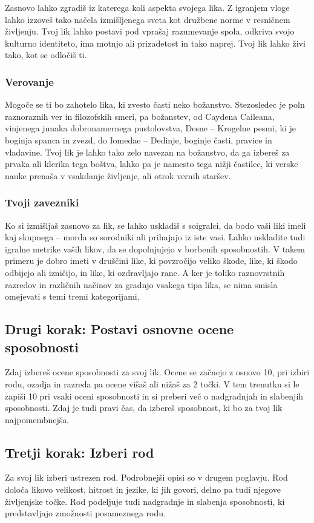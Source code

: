 Zasnovo lahko zgradiš iz katerega koli aspekta svojega lika. Z igranjem vloge lahko izzoveš tako načela izmišljenega sveta kot družbene norme v resničnem življenju. Tvoj lik lahko postavi pod vprašaj razumevanje spola, odkriva svojo kulturno identiteto, ima motnjo ali prizadetost in tako naprej. Tvoj lik lahko živi tako, kot se odločiš ti.

\subsubsection{Verovanje}
Mogoče se ti bo zahotelo lika, ki zvesto časti neko božanstvo. Stezosledec je poln raznoraznih ver in filozofskih smeri, pa božanstev, od Caydena Caileana, vinjenega junaka dobronamernega pustolovstva, Desne -- Krogelne pesmi, ki je boginja spanca in zvezd, do Iomedae -- Dedinje, boginje časti, pravice in vladavine. Tvoj lik je lahko tako zelo navezan na božanstvo, da ga izbereš za prvaka ali klerika tega boštva, lahko pa je namesto tega nižji častilec, ki verske nauke prenaša v vsakdanje življenje, ali otrok vernih staršev.

\subsubsection{Tvoji zavezniki}
Ko si izmišljaš zasnovo za lik, se lahko uskladiš s soigralci, da bodo vaši liki imeli kaj skupnega -- morda so sorodniki ali prihajajo iz iste vasi. Lahko uskladite tudi igralne metrike vaših likov, da se dopolnjujejo v borbenih sposobnostih. V takem primeru je dobro imeti v druščini like, ki povzročijo veliko škode, like, ki škodo odbijejo ali izničijo, in like, ki ozdravljajo rane. A ker je toliko raznovrstnih razredov in različnih načinov za gradnjo vsakega tipa lika, se nima smisla omejevati s temi tremi kategorijami.

\subsection{Drugi korak: Postavi osnovne ocene sposobnosti}
Zdaj izbereš ocene sposobnosti za svoj lik. Ocene se začnejo z osnovo 10, pri izbiri rodu, ozadja in razreda pa ocene višaš ali nižaš za 2 točki. V tem trenutku si le zapiši 10 pri vsaki oceni sposobnosti in si preberi več o nadgradnjah in slabenjih sposobnosti. Zdaj je tudi pravi čas, da izbereš sposobnost, ki bo za tvoj lik najpomembnejša.

\subsection{Tretji korak: Izberi rod}
Za svoj lik izberi ustrezen rod. Podrobnejši opisi so v drugem poglavju. Rod določa likovo velikost, hitrost in jezike, ki jih govori, delno pa tudi njegove življenjske točke. Rod podeljuje tudi nadgradnje in slabenja sposobnosti, ki predstavljajo zmožnosti posameznega rodu.

